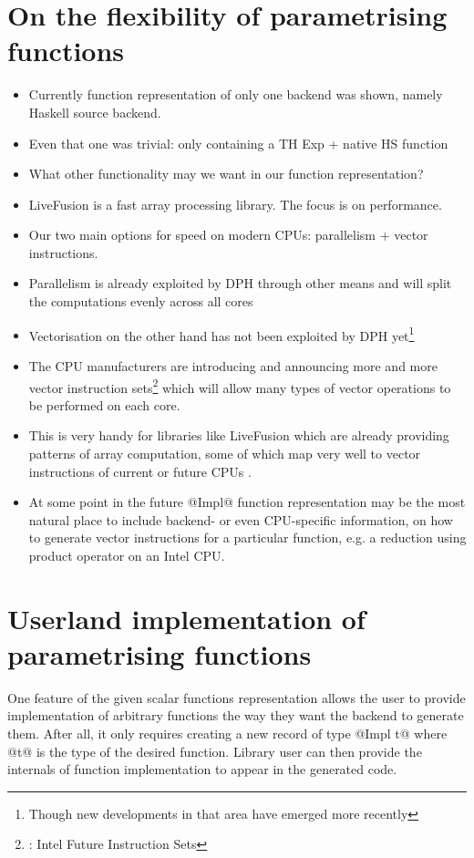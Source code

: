 \documentclass[preamble.tex]{subfiles}
\begin{document}
\section{On the flexibility of parametrising functions}

\begin{itemize}
\item Currently function representation of only one backend was shown, namely Haskell source backend.
\item Even that one was trivial: only containing a TH Exp + native HS function
\item What other functionality may we want in our function representation?
\item LiveFusion is a fast array processing library. The focus is on performance.
\item Our two main options for speed on modern CPUs: parallelism + vector instructions.
\item Parallelism is already exploited by DPH through other means and will split the computations evenly across all cores
\item Vectorisation on the other hand has not been exploited by DPH yet\footnote{Though new developments in that area have emerged more recently }
\item The CPU manufacturers are introducing and announcing more and more vector instruction sets\footnote{: Intel Future Instruction Sets} which will allow many types of vector operations to be performed on each core.
\item This is very handy for libraries like LiveFusion which are already providing patterns of array computation, some of which map very well to vector instructions of current or future CPUs .
\item At some point in the future @Impl@ function representation may be the most natural place to include backend- or even CPU-specific information, on how to generate vector instructions for a particular function, e.g. a reduction using product operator on an Intel CPU.
\end{itemize}

\section{Userland implementation of parametrising functions}

One feature of the given scalar functions representation allows the user to provide implementation of arbitrary functions the way they want the backend to generate them. After all, it only requires creating a new record of type @Impl t@ where @t@ is the type of the desired function. Library user can then provide the internals of function implementation to appear in the generated code.
\end{document}
